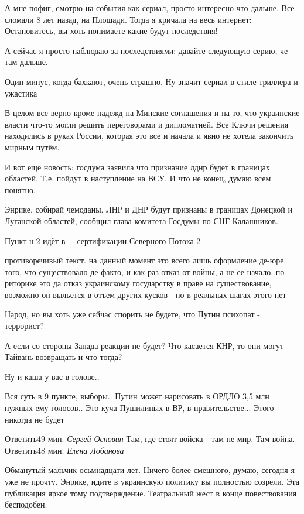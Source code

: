 \begin{itemize}

А мне пофиг, смотрю на события как сериал, просто интересно что дальше. Все
сломали 8 лет назад, на Площади. Тогда я кричала на весь интернет:
Остановитесь, вы хоть понимаете какие будут последствия!

А сейчас я просто наблюдаю за последствиями: давайте следующую серию, че там
дальше.

Один минус, когда бахкают, очень страшно. Ну значит сериал в стиле триллера и
ужастика


В целом все верно кроме надежд на Минские соглашения и на то, что украинские
власти что-то могли решить переговорами и дипломатией. Все Ключи решения
находились в руках России, которая это все и начала и явно не хотела закончить
мирным путём.

И вот ещё новость: госдума заявила что признание лднр будет в границах
областей. Т.е. пойдут в наступление на ВСУ. И что не конец, думаю всем понятно.


Энрике, собирай чемоданы. ЛНР и ДНР будут признаны в границах Донецкой и
Луганской областей, сообщил глава комитета Госдумы по СНГ Калашников.

Пункт н.2 идёт в + сертификации Северного Потока-2


противоречивый текст. на данный момент это всего лишь оформление де-юре того,
что существовало де-факто, и как раз отказ от войны, а не ее начало. по
риторике это да отказ украинскому государству в праве на существование,
возможно он выльется в отъем других кусков - но в реальных шагах этого нет

Народ, но вы хоть уже сейчас спорить не будете, что Путин психопат - террорист?

А если со стороны Запада реакции не будет?
Что касается КНР, то они могут Тайвань возвращать и что тогда?

Ну и каша у вас в голове..


Вся суть в 9 пункте, выборы.. Путин может нарисовать в ОРДЛО 3,5 млн нужных ему
голосов.. Это куча Пушилиных в ВР, в правительстве... Этого никогда не будет

Ответить49 мин.
\emph{Сергей Основин}
Там, где стоят войска - там не мир. Там война.
Ответить48 мин.
\emph{Елена Лобанова}

Обманутый мальчик осьмнадцати лет. Ничего более смешного, думаю, сегодня я уже
не прочту. Энрике, идите в украинскую политику вы полностью созрели. Эта
публикация яркое тому подтверждение. Театральный жест в конце повествования
бесподобен.

\end{itemize} %


